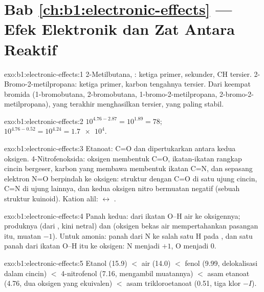 \section*{Bab \ref{ch:b1:electronic-effects} --- Efek Elektronik dan Zat Antara Reaktif}

\begin{solution}{exo:b1:electronic-effects:1}
2-Metilbutana, : ketiga  primer, 
sekunder, CH tersier. 2-Bromo-2-metilpropana: ketiga  primer,
karbon tengahnya tersier. Dari keempat bromida 
(1-bromobutana, 2-bromobutana, 1-bromo-2-metilpropana,
2-bromo-2-metilpropana), yang terakhir menghasilkan  tersier,
yang paling stabil.
\end{solution}

\begin{solution}{exo:b1:electronic-effects:2}
$10^{4.76 - 2.87} = 10^{1.89} = 78$; $10^{4.76 - 0.52} = 10^{4.24} =
\num{1.7e4}$.
\end{solution}

\begin{solution}{exo:b1:electronic-effects:3}
Etanoat: C=O dan  dipertukarkan antara kedua oksigen.
4-Nitrofenoksida:  oksigen membentuk C=O,
ikatan-ikatan rangkap cincin bergeser, karbon yang membawa 
membentuk ikatan C=N, dan sepasang elektron N=O berpindah ke oksigen:
struktur dengan C=O di satu ujung cincin, C=N di ujung lainnya, dan
kedua oksigen nitro bermuatan negatif (sebuah struktur kuinoid). Kation
alil:  $\leftrightarrow$ .
\end{solution}

\begin{solution}{exo:b1:electronic-effects:4}
Panah kedua: dari ikatan O--H air ke oksigennya; produknya 
(dari , kini netral) dan  (oksigen bekas air
mempertahankan pasangan itu, muatan $-1$). Untuk amonia: panah dari
 N ke salah satu H pada , dan satu panah
dari ikatan O--H itu ke oksigen: N menjadi $+1$, O menjadi 0.
\end{solution}

\begin{solution}{exo:b1:electronic-effects:5}
Etanol (15.9) $<$ air (14.0) $<$ fenol (9.99, delokalisasi dalam
cincin) $<$ 4-nitrofenol (7.16,  mengambil muatannya) $<$ asam
etanoat (4.76, dua oksigen yang ekuivalen) $<$ asam trikloroetanoat
(0.51, tiga klor $-I$).
\end{solution}

